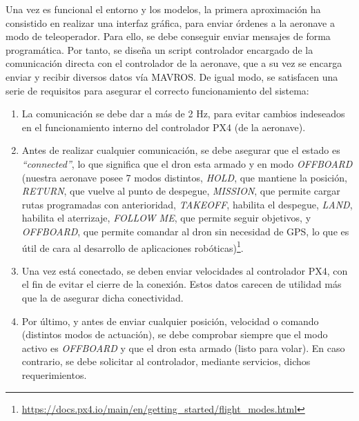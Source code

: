 Una vez es funcional el entorno y los modelos, la primera aproximación ha consistido en realizar una interfaz gráfica, para enviar órdenes a la aeronave a modo de teleoperador. Para ello, se debe conseguir enviar mensajes de forma programática. Por tanto, se diseña un script controlador encargado de la comunicación directa con el controlador de la aeronave, que a su vez se encarga enviar y recibir diversos datos vía MAVROS. De igual modo, se satisfacen una serie de requisitos para asegurar el correcto funcionamiento del sistema:

\begin{enumerate}
	\item La comunicación se debe dar a más de 2 Hz, para evitar cambios indeseados en el funcionamiento interno del controlador PX4 (de la aeronave).
	\item Antes de realizar cualquier comunicación, se debe asegurar que el estado es \emph{``connected''}, lo que significa que el dron esta armado y en modo \emph{OFFBOARD} (nuestra aeronave posee 7 modos distintos, \emph{HOLD}, que mantiene la posición, \emph{RETURN}, que vuelve al punto de despegue, \emph{MISSION}, que permite cargar rutas programadas con anterioridad, \emph{TAKEOFF}, habilita el despegue, \emph{LAND}, habilita el aterrizaje, \emph{FOLLOW ME}, que permite seguir objetivos, y \emph{OFFBOARD}, que permite comandar al dron sin necesidad de GPS, lo que es útil de cara al desarrollo de aplicaciones robóticas)\footnote[1]{\url{https://docs.px4.io/main/en/getting_started/flight_modes.html}}.
    \item Una vez está conectado, se deben enviar velocidades al controlador PX4, con el fin de evitar el cierre de la conexión. Estos datos carecen de utilidad más que la de asegurar dicha conectividad.
    \item Por último, y antes de enviar cualquier posición, velocidad o comando (distintos modos de actuación), se debe comprobar siempre que el modo activo es \emph{OFFBOARD} y que el dron esta armado (listo para volar). En caso contrario, se debe solicitar al controlador, mediante servicios, dichos requerimientos.
\end{enumerate}

